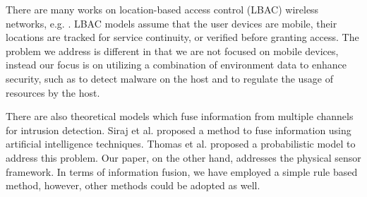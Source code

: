 There are many works on location-based access control (LBAC) 
wireless networks, e.g. \cite{ardagna06}. 
LBAC models assume that the user devices are mobile,
their locations are tracked for service continuity, or verified
before granting access.  The problem we address is different in that
we are not focused on mobile devices, instead our focus is on
utilizing a combination of environment data to enhance security,
such as to detect malware on the host and to regulate the usage of
resources by the host.

There are also theoretical models which fuse information from multiple channels
for intrusion detection.
Siraj et al. proposed a method \cite{siraj04} to fuse information
using artificial intelligence techniques.
Thomas et al. proposed a probabilistic model \cite{thomas09} to address
this problem.
Our paper, on the other hand, addresses the physical sensor framework.
In terms of information fusion, we have employed
a simple rule based method, however, other methods could be adopted as well.
